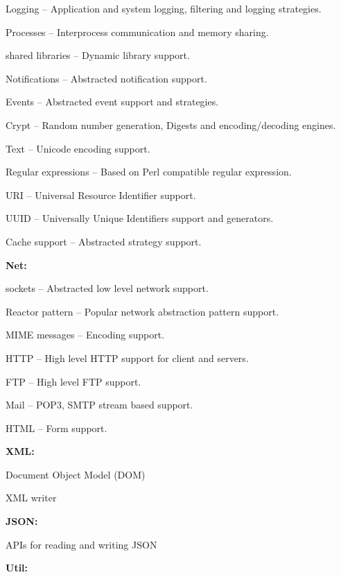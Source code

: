 \begin{DoxyItemize}
\begin{DoxyItemize}
\begin{DoxyItemize}
\item Logging – Application and system logging, filtering and logging strategies.
\item Processes – Interprocess communication and memory sharing.
\item shared libraries – Dynamic library support.
\item Notifications – Abstracted notification support.
\item Events – Abstracted event support and strategies.
\item Crypt – Random number generation, Digests and encoding/decoding engines.
\item Text – Unicode encoding support.
\item Regular expressions – Based on Perl compatible regular expression.
\item U\+RI – Universal Resource Identifier support.
\item U\+U\+ID – Universally Unique Identifiers support and generators.
\item Cache support – Abstracted strategy support.
\end{DoxyItemize}
\item {\bfseries Net\+:}
\begin{DoxyItemize}
\item sockets – Abstracted low level network support.
\item Reactor pattern – Popular network abstraction pattern support.
\item M\+I\+ME messages – Encoding support.
\item H\+T\+TP – High level H\+T\+TP support for client and servers.
\item F\+TP – High level F\+TP support.
\item Mail – P\+O\+P3, S\+M\+TP stream based support.
\item H\+T\+ML – Form support.
\end{DoxyItemize}
\item {\bfseries X\+ML\+:}
\begin{DoxyItemize}
\item Document Object Model (D\+OM)
\item X\+ML writer
\end{DoxyItemize}
\item {\bfseries J\+S\+ON\+:}
\begin{DoxyItemize}
\item A\+P\+Is for reading and writing J\+S\+ON
\end{DoxyItemize}
\item {\bfseries Util\+:}

\end{DoxyItemize}
\end{DoxyItemize}
